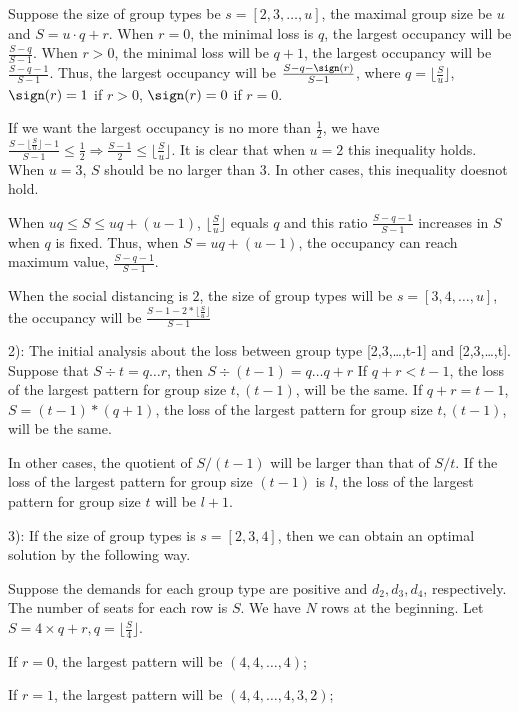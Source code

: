 Suppose the size of group types be $s = [2,3,\ldots,u]$, the maximal group size be $u$ and $S = u\cdot q + r$. When $r =0$, the minimal loss is $q$, the largest occupancy will be $\frac{S-q}{S-1}$.
When $r>0$, the minimal loss will be $q+1$, the largest occupancy will be $\frac{S-q-1}{S-1}$.
Thus, the largest occupancy will be $\frac{S-q-\sign(r)}{S-1}$, where $q = \lfloor \frac{S}{u} \rfloor$, $\sign(r)=1$ if $r >0$, $\sign(r)=0$ if $r =0$.


If we want the largest occupancy is no more than $\frac{1}{2}$, we have $\frac{S-\lfloor \frac{S}{u} \rfloor -1}{S-1} \leq \frac{1}{2} \Rightarrow \frac{S-1}{2} \leq \lfloor \frac{S}{u} \rfloor$. It is clear that when $u =2$ this inequality holds. When $u =3$, $S$ should be no larger than 3. In other cases, this inequality doesnot hold.

When $uq \leq S \leq uq + (u-1)$, $\lfloor \frac{S}{u} \rfloor$ equals $q$ and this ratio $\frac{S-q-1}{S-1}$ increases in $S$ when $q$ is fixed. Thus, when $S = uq + (u-1)$, the occupancy can reach maximum value, $\frac{S-q-1}{S-1}$.

When the social distancing is $2$, the size of group types will be $s = [3,4,\ldots,u]$, the occupancy will be $\frac{S-1-2*\lfloor \frac{S}{u} \rfloor}{S-1}$


2): The initial analysis about the loss between group type [2,3,\ldots,t-1] and [2,3,\ldots,t].
Suppose that $S \div t = q \ldots r$, then $S \div (t-1) = q \ldots q+r$
If $q+r < t-1$, the loss of the largest pattern for group size $t,(t-1)$, will be the same.
If $q+r = t-1$, $S = (t-1)* (q+1)$, the loss of the largest pattern for group size $t,(t-1)$, will be the same.

In other cases, the quotient of $S/(t-1)$ will be larger than that of $S/t$.
If the loss of the largest pattern for group size $(t-1)$ is $l$, the loss of the largest pattern for group size $t$ will be $l+1$.

3): If the size of group types is $s = [2,3,4]$, then we can obtain an optimal solution by the following way.

Suppose the demands for each group type are positive and $d_2,d_3,d_4$, respectively. The number of seats for each row is $S$. We have $N$ rows at the beginning. Let $S = 4 \times q +r, q = \lfloor \frac{S}{4} \rfloor$.

If $r = 0$, the largest pattern will be $(4,4,\ldots,4)$;

If $r = 1$, the largest pattern will be $(4,4,\ldots,4,3,2)$;

